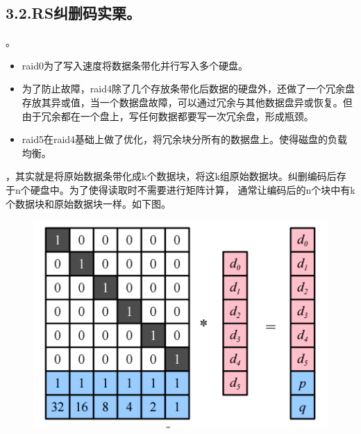 \documentclass{article}
\begin{document}
\subsection{3.2.\hspace*{0.5em}RS纠删码实栗。}\label{sec-rs}%

。%

\begin{itemize}%

\item{}
raid0为了写入速度将数据条带化并行写入多个硬盘。%

\item{}
为了防止故障，raid4除了几个存放条带化后数据的硬盘外，还做了一个冗余盘存放其异或值，当一个数据盘故障，可以通过冗余与其他数据盘异或恢复。但由于冗余都在一个盘上，写任何数据都要写一次冗余盘，形成瓶颈。%

\item{}
raid5在raid4基础上做了优化，将冗余块分所有的数据盘上。使得磁盘的负载均衡。%
\end{itemize}%

，其实就是将原始数据条带化成k个数据块，将这k组原始数据块。纠删编码后存于n个硬盘中。为了使得读取时不需要进行矩阵计算，
通常让编码后的n个块中有k个数据块和原始数据块一样。如下图。%

\begin{figure}[tbp]%
\begin{mdcenter}%

\noindent\includegraphics[keepaspectratio=true,width=\dimmin{}{\dimwidth{0.60}}]{images/rs1}{}%

\mdhr{}%

\noindent{}%
\end{mdcenter}%
\end{figure}%
\end{document}
